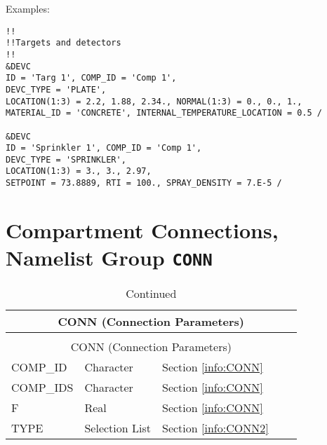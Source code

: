 
\vspace{\baselineskip}
\noindent Examples:
\begin{lstlisting}
!!
!!Targets and detectors
!!
&DEVC
ID = 'Targ 1', COMP_ID = 'Comp 1',
DEVC_TYPE = 'PLATE',
LOCATION(1:3) = 2.2, 1.88, 2.34., NORMAL(1:3) = 0., 0., 1.,
MATERIAL_ID = 'CONCRETE', INTERNAL_TEMPERATURE_LOCATION = 0.5 /

&DEVC
ID = 'Sprinkler 1', COMP_ID = 'Comp 1',
DEVC_TYPE = 'SPRINKLER',
LOCATION(1:3) = 3., 3., 2.97,
SETPOINT = 73.8889, RTI = 100., SPRAY_DENSITY = 7.E-5 /
\end{lstlisting}



\clearpage
\section{Compartment Connections, Namelist Group \texorpdfstring{{\tt CONN}}{CONN}}

\begin{longtable}{@{\extracolsep{\fill}}|l|l|l|l|l|}
\caption[Connection Parameters ({\ct CONN} namelist group)]{For more information see Section~\ref{info:CONN}.}
\label{tbl:CONN} \\
\hline
\multicolumn{5}{|c|}{{\ct CONN} (Connection Parameters)} \\
\hline \hline
\endfirsthead
\caption[]{Continued} \\
\hline
\multicolumn{5}{|c|}{{\ct CONN} (Connection Parameters)} \\
\hline \hline
\endhead
{\ct COMP\_ID}              & Character & Section \ref{info:CONN}                 &           &  		\\ \hline
{\ct COMP\_IDS}              & Character & Section \ref{info:CONN}                 &           &  		\\ \hline
{\ct F}             & Real      & Section \ref{info:CONN}     &           &                 \\ \hline
{\ct TYPE}        	    & Selection List     & Section \ref{info:CONN2}                 &           &                 \\ \hline
\end{longtable}

